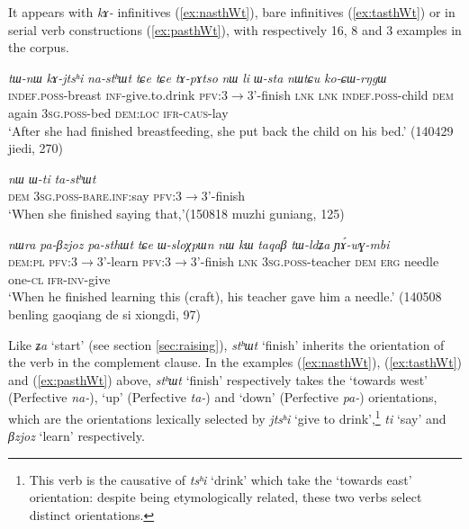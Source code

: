 \documentclass[oneside,a4paper,11pt]{article}
\newcommand{\ipa}[1]{\textit{\phon#1}}
\newcommand{\jpg}[2]{\ipa{#1} `#2'}
\begin{document}
It appears with \ipa{kɤ-} infinitives (\ref{ex:nasthWt}), bare infinitives (\ref{ex:tasthWt}) or in serial verb constructions (\ref{ex:pasthWt}), with respectively 16, 8 and 3 examples in the corpus. 

\begin{exe}
\ex \label{ex:nasthWt}
\gll \ipa{tɯ-nɯ} 	\ipa{kɤ-jtsʰi} 	\ipa{na-stʰɯt} 	\ipa{tɕe} 	\ipa{tɕe} 	\ipa{tɤ-pɤtso} 	\ipa{nɯ} 	\ipa{li} 	\ipa{ɯ-sta} 	\ipa{nɯtɕu} 	\ipa{ko-ɕɯ-rŋgɯ} 	\\
\textsc{indef.poss}-breast \textsc{inf}-give.to.drink \textsc{pfv}:3$\rightarrow$3'-finish \textsc{lnk} \textsc{lnk} \textsc{indef.poss}-child \textsc{dem} again \textsc{3sg.poss}-bed \textsc{dem:loc} \textsc{ifr-caus}-lay \\
\glt `After she had finished breastfeeding, she put back the child on his bed.' (140429 jiedi, 270)
\end{exe}

\begin{exe}
\ex \label{ex:tasthWt}
\gll
\ipa{nɯ} 	\ipa{ɯ-ti} 	\ipa{ta-stʰɯt} \\
\textsc{dem} \textsc{3sg.poss-bare.inf}:say \textsc{pfv}:3$\rightarrow$3'-finish \\
\glt `When she finished saying that,'(150818 muzhi guniang, 125)
\end{exe}

\begin{exe}
\ex \label{ex:pasthWt}
\gll 	\ipa{nɯra} 	\ipa{pa-βzjoz}	\ipa{pa-sthɯt} \ipa{tɕe} \ipa{ɯ-sloχpɯn} 	\ipa{nɯ} 	\ipa{kɯ} 	\ipa{taqaβ} 	\ipa{tɯ-ldʑa} 	\ipa{ɲɤ́-wɣ-mbi} 
\\
 \textsc{dem:pl} \textsc{pfv}:3$\rightarrow$3'-learn \textsc{pfv}:3$\rightarrow$3'-finish \textsc{lnk} \textsc{3sg.poss}-teacher \textsc{dem} \textsc{erg} needle one-\textsc{cl} \textsc{ifr-inv}-give  \\
\glt `When he finished learning this (craft), his teacher gave him a needle.' (140508 benling gaoqiang de si xiongdi, 97)
\end{exe} 

Like \jpg{ʑa}{start} (see section \ref{sec:raising}), \jpg{stʰɯt}{finish} inherits the orientation of the verb in the complement clause. In the examples (\ref{ex:nasthWt}),  (\ref{ex:tasthWt}) and (\ref{ex:pasthWt}) above, \jpg{stʰɯt}{finish} respectively takes the `towards west' (Perfective \ipa{na-}), `up' (Perfective \ipa{ta-}) and `down' (Perfective \ipa{pa-}) orientations, which are the orientations lexically selected by \jpg{jtsʰi}{give to drink},\footnote{This verb is the causative of \jpg{tsʰi}{drink} which take the `towards east' orientation: despite being etymologically related, these two verbs select distinct orientations.}  \jpg{ti}{say} and \jpg{βzjoz}{learn} respectively.
\end{document}
